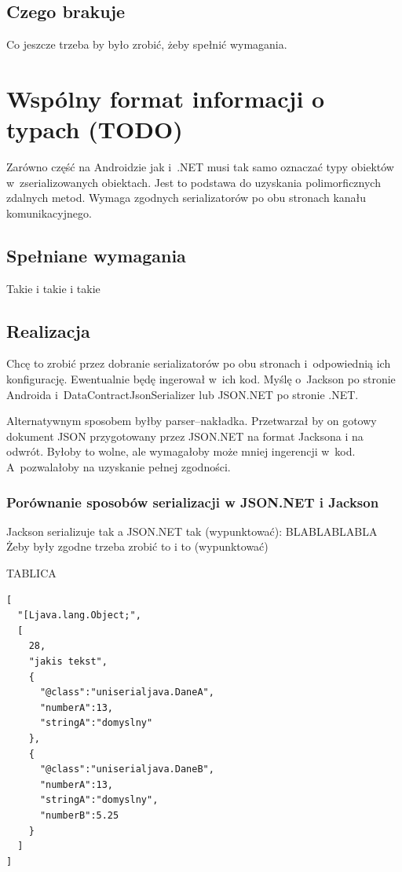 \subsection{Czego brakuje}
Co jeszcze trzeba by było zrobić, żeby spełnić wymagania.



\section{Wspólny format informacji o typach (TODO)}
Zarówno część na Androidzie jak i~.NET musi tak samo oznaczać typy obiektów w~zserializowanych obiektach.
Jest to podstawa do uzyskania polimorficznych zdalnych metod.
Wymaga zgodnych serializatorów po obu stronach kanału komunikacyjnego.


\subsection{Spełniane wymagania}
Takie i takie i takie


\subsection{Realizacja}
Chcę to zrobić przez dobranie serializatorów po obu stronach i~odpowiednią ich konfigurację. Ewentualnie będę ingerował w~ich kod.
Myślę o~Jackson po stronie Androida i~DataContractJsonSerializer lub JSON.NET po stronie .NET\@.

Alternatywnym sposobem byłby parser--nakładka. Przetwarzał by on gotowy dokument JSON przygotowany przez JSON.NET na format Jacksona i na odwrót. Byłoby to wolne, ale wymagałoby może mniej ingerencji w~kod. A~pozwalałoby na uzyskanie pełnej zgodności.

\subsubsection{Porównanie sposobów serializacji w JSON.NET i Jackson}
Jackson serializuje tak a JSON.NET tak (wypunktować):
BLABLABLABLA
Żeby były zgodne trzeba zrobić to i to (wypunktować)

TABLICA
\begin{lstlisting}[float, frame=single, caption={Jackson daje.}, label=kod:jackson-serilization]
[
  "[Ljava.lang.Object;",
  [
    28,
    "jakis tekst",
    {
      "@class":"uniserialjava.DaneA",
      "numberA":13,
      "stringA":"domyslny"
    },
    {
      "@class":"uniserialjava.DaneB",
      "numberA":13,
      "stringA":"domyslny",
      "numberB":5.25
    }
  ]
]
\end{lstlisting}

